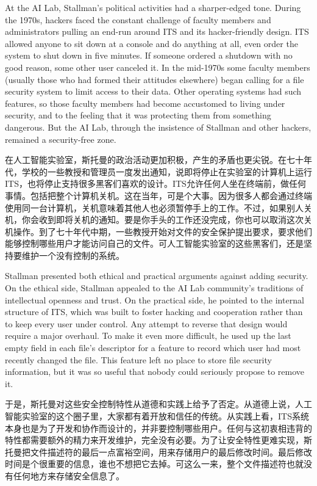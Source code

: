 \ifdefined\eng
At the AI Lab, Stallman's political activities had a sharper-edged tone. During the 1970s, hackers faced the constant challenge of faculty members and administrators pulling an end-run around ITS and its hacker-friendly design. ITS allowed anyone to sit down at a console and do anything at all, even order the system to shut down in five minutes. If someone ordered a shutdown with no good reason, some other user canceled it. In the mid-1970s some faculty members (usually those who had formed their attitudes elsewhere) began calling for a file security system to limit access to their data.   Other operating systems had such features, so those faculty members had become accustomed to living under security, and to the feeling that it was protecting them from something dangerous. But the AI Lab, through the insistence of Stallman and other hackers, remained a security-free zone.
\fi

\ifdefined\chs
在人工智能实验室，斯托曼的政治活动更加积极，产生的矛盾也更尖锐。在七十年代，学校的一些教授和管理员一度发出通知，说即将停止在实验室的计算机上运行ITS，也将停止支持很多黑客们喜欢的设计。ITS允许任何人坐在终端前，做任何事情。包括把整个计算机关机。这在当年，可是个大事。因为很多人都会通过终端使用同一台计算机，关机意味着其他人也必须暂停手上的工作。不过，如果别人关机，你会收到即将关机的通知。要是你手头的工作还没完成，你也可以取消这次关机操作。到了七十年代中期，一些教授开始对文件的安全保护提出要求，要求他们能够控制哪些用户才能访问自己的文件。可人工智能实验室的这些黑客们，还是坚持要维护一个没有控制的系统。
\fi

\ifdefined\eng
Stallman presented both ethical and practical arguments against adding security. On the ethical side, Stallman appealed to the AI Lab community's traditions of intellectual openness and trust. On the practical side, he pointed to the internal structure of ITS, which was built to foster hacking and cooperation rather than to keep every user under control.  Any attempt to reverse that design would require a major overhaul. To make it even more difficult, he used up the last empty field in each file's descriptor for a feature to record which user had most recently changed the file. This feature left no place to store file security information, but it was so useful that nobody could seriously propose to remove it.
\fi

\ifdefined\chs
于是，斯托曼对这些安全控制特性从道德和实践上给予了否定。从道德上说，人工智能实验室的这个圈子里，大家都有着开放和信任的传统。从实践上看，ITS系统本身也是为了开发和协作而设计的，并非要控制哪些用户。任何与这初衷相违背的特性都需要额外的精力来开发维护，完全没有必要。为了让安全特性更难实现，斯托曼把文件描述符的最后一点富裕空间，用来存储用户的最后修改时间。最后修改时间是个很重要的信息，谁也不想把它去掉。可这么一来，整个文件描述符也就没有任何地方来存储安全信息了。
\fi

